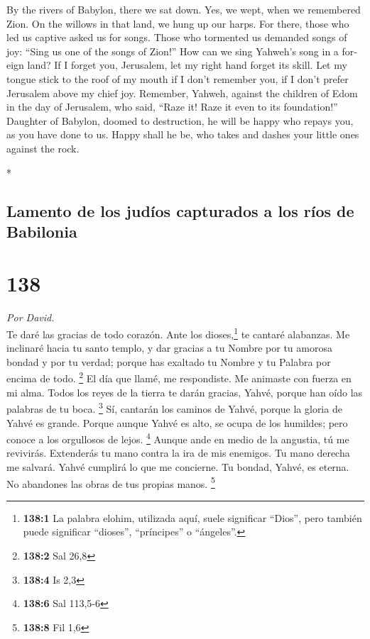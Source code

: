 \begin{paracol}{2}
\begin{otherlanguage}{english}
 By the rivers of Babylon, there we sat down. Yes, we
wept, when we remembered Zion.  On the willows in that
land, we hung up our harps.  For there, those who led us
captive asked us for songs. Those who tormented us demanded songs of
joy: ``Sing us one of the songs of Zion!''  How can we
sing Yahweh's song in a foreign land?  If I forget you,
Jerusalem, let my right hand forget its skill.  Let my
tongue stick to the roof of my mouth if I don't remember you, if I don't
prefer Jerusalem above my chief joy.  Remember, Yahweh,
against the children of Edom in the day of Jerusalem, who said, ``Raze
it! Raze it even to its foundation!''  Daughter of
Babylon, doomed to destruction, he will be happy who repays you, as you
have done to us.  Happy shall he be, who takes and dashes
your little ones against the rock.

\end{otherlanguage}

\switchcolumn[0]*

\hypertarget{lamento-de-los-juduxedos-capturados-a-los-ruxedos-de-babilonia-1}{%
\subsection{Lamento de los judíos capturados a los ríos de
Babilonia}\label{lamento-de-los-juduxedos-capturados-a-los-ruxedos-de-babilonia-1}}

\hypertarget{section-274}{%
\section{138}\label{section-274}}

\emph{Por David.}\\
 Te daré las gracias de todo corazón. Ante los
dioses,\footnote{\textbf{138:1} La palabra elohim, utilizada aquí, suele
  significar ``Dios'', pero también puede significar ``dioses'',
  ``príncipes'' o ``ángeles''.} te cantaré alabanzas.  Me
inclinaré hacia tu santo templo, y dar gracias a tu Nombre por tu
amorosa bondad y por tu verdad; porque has exaltado tu Nombre y tu
Palabra por encima de todo. \footnote{\textbf{138:2} Sal 26,8}
 El día que llamé, me respondiste. Me animaste con fuerza
en mi alma.  Todos los reyes de la tierra te darán
gracias, Yahvé, porque han oído las palabras de tu boca. \footnote{\textbf{138:4}
  Is 2,3}  Sí, cantarán los caminos de Yahvé, porque la
gloria de Yahvé es grande.  Porque aunque Yahvé es alto,
se ocupa de los humildes; pero conoce a los orgullosos de lejos.
\footnote{\textbf{138:6} Sal 113,5-6}  Aunque ande en
medio de la angustia, tú me revivirás. Extenderás tu mano contra la ira
de mis enemigos. Tu mano derecha me salvará.  Yahvé
cumplirá lo que me concierne. Tu bondad, Yahvé, es eterna. No abandones
las obras de tus propias manos. \footnote{\textbf{138:8} Fil 1,6}


\end{paracol}
